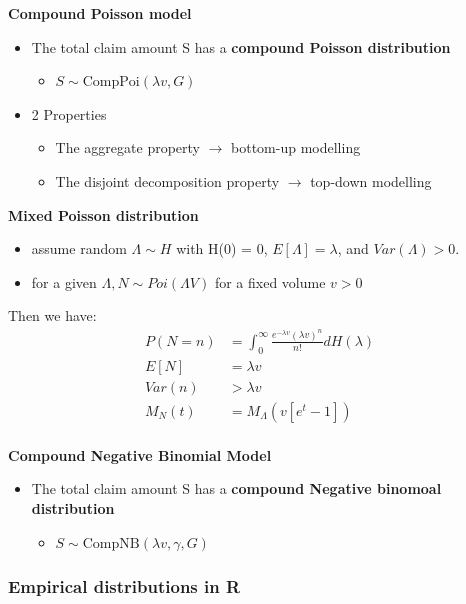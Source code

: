 \documentclass{article}
\begin{document}
\noindent \textbf{Compound Poisson model}
\begin{itemize}
\item The total claim amount S has a \textbf{compound Poisson distribution}
    \begin{itemize}
        \item $S \sim \text{CompPoi}(\lambda v, G)$
    \end{itemize}
    \item 2 Properties
    \begin{itemize}
        \item The aggregate property $\rightarrow$  bottom-up modelling
        \item The disjoint decomposition property $\rightarrow$ top-down modelling
    \end{itemize}
\end{itemize}


\noindent \textbf{Mixed Poisson distribution}
\begin{itemize}
    \item assume random $\Lambda \sim H$ with H(0) = 0, $E[\Lambda] = \lambda$, and $Var(\Lambda) > 0$.
    \item for a given $\Lambda, N \sim Poi(\Lambda V)$ for a fixed volume $v > 0$
\end{itemize}

Then we have:
\begin{align*}
    P(N=n) &= \int_0^\infty \frac{e^{-\lambda v} (\lambda v)^n}{n!} d H(\lambda)\\
    E[N] &= \lambda v \\
    Var(n) &> \lambda v \\
    M_N(t) &= M_\Lambda (v[e^t-1])\\
\end{align*}



\noindent \textbf{Compound Negative Binomial Model}
\begin{itemize}
    \item The total claim amount S has a \textbf{compound Negative binomoal distribution}
    \begin{itemize}
        \item $S \sim \text{CompNB}(\lambda v, \gamma, G)$
    \end{itemize}
\end{itemize}


\subsubsection{Empirical distributions in R}
\end{document}
